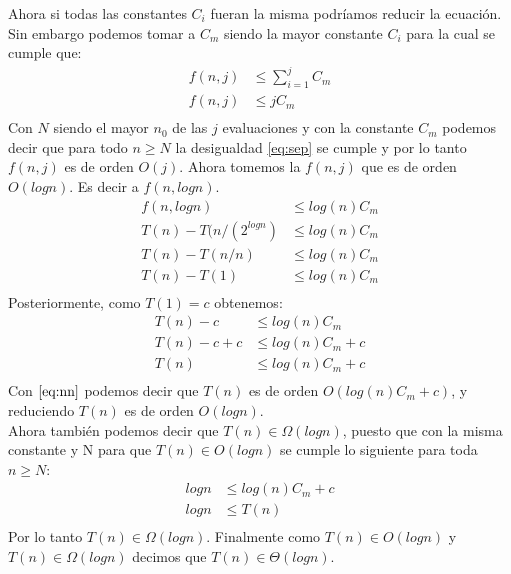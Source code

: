 \documentclass[12pt]{article}
\begin{document}
Ahora si todas las constantes $C_i$ fueran la misma podríamos reducir la ecuación. Sin embargo podemos tomar a $C_m$ siendo la mayor constante $C_i$ para la cual se cumple que:
\begin{equation}\label{eq:sep}
\begin{split}
	f(n,j) & \leq \sum_{i=1}^{j}{C_m} \\
	f(n,j) & \leq jC_m \\
\end{split}
\end{equation}
Con $N$ siendo el mayor $n_0$ de las $j$ evaluaciones y con la constante $C_m$ podemos decir que para todo $n\geq N$ la desigualdad \eqref{eq:sep} se cumple y por lo tanto $f(n,j)$ es de orden $O(j)$.
Ahora tomemos la $f(n,j)$ que es de orden $O(logn)$. Es decir a $f(n,logn)$.
\begin{equation}\label{eq:oct}
\begin{split}
	f(n,logn) & \leq log(n)C_m \\
	T(n)-T(n/(2^{logn}) & \leq log(n)C_m\\
	T(n)-T(n/n) & \leq log(n)C_m\\
	T(n)-T(1) & \leq log(n)C_m\\
\end{split}
\end{equation}
Posteriormente, como $T(1)=c$ obtenemos:
\begin{equation}\label{eq:nn}
\begin{split}
T(n)-c & \leq log(n)C_m\\
T(n)-c+c& \leq log(n)C_m +c\\
T(n) & \leq log(n)C_m + c\\
\end{split}
\end{equation}
Con $\eqref{eq:nn}$ podemos decir que $T(n)$ es de orden $O(log(n)C_m + c)$, y reduciendo $T(n)$ es de orden $O(logn)$.\\
Ahora también podemos decir que $T(n) \in \Omega(logn)$, puesto que con la misma constante y N para que $T(n)\in O(logn)$ se cumple lo siguiente para toda $n\geq N$:
\begin{equation}\label{eq:dz}
\begin{split}
logn & \leq log(n)C_m + c \\
logn & \leq T(n) \\
\end{split}
\end{equation}
Por lo tanto $T(n)\in \Omega(logn)$.
Finalmente como $T(n) \in O(logn)$ y $T(n)\in \Omega(logn)$ decimos que $T(n) \in \Theta(logn)$.
\end{document}
